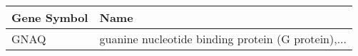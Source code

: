 \begin{tabular}{ll}
\toprule
Gene Symbol &                                               Name \\
\midrule
       GNAQ & guanine nucleotide binding protein (G protein),... \\
\bottomrule
\end{tabular}
